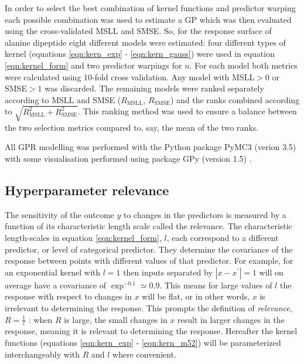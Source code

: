 In order to select the best combination of kernel functions and predictor warping each possible combination was used to estimate a GP which was then evaluated using the cross-validated MSLL and SMSE. So, for the response surface of alanine dipeptide eight different models were estimated: four different types of kernel (equations \ref{eqn:kern_exp} - \ref{eqn:kern_gauss}) were used in equation \ref{eqn:kernel_form} and two predictor warpings for $n$. For each model both metrics were calculated using 10-fold cross validation. Any model with MSLL$ > 0$ or SMSE$ > 1$ was discarded. The remaining models were ranked separately according to MSLL and SMSE ($R_{\mathrm{MSLL}}$, $R_{\mathrm{SMSE}}$) and the ranks combined according to $\sqrt{R_{\mathrm{MSLL}}^2 + R_{\mathrm{SMSE}}^2}$. This ranking method was used to ensure a balance between the two selection metrics compared to, say, the mean of the two ranks.  

All GPR modelling was performed with the Python package PyMC3 (verion 3.5) \cite{salvatierProbabilisticProgrammingPython2016} with some visualisation performed using package GPy (version 1.5) \cite{gpy2014}. 

\subsection{Hyperparameter relevance}\label{sub:msm_meth_rel}

The sensitivity of the outcome $y$ to changes in the predictors is measured by a function of its characteristic length scale called the relevance. The characteristic length-scales in equation \ref{eqn:kernel_form}, $l$, each correspond to a different predictor, or level of categorical predictor. They determine the covariance of the response between points with different values of that predictor. For example, for an exponential kernel with $l=1$ then inputs separated by $|x-x^{\prime}|= 1$ will on average have a covariance of $\exp^{-0.1}\simeq 0.9$. This means for large values of $l$ the response with respect to changes in $x$ will be flat, or in other words, $x$ is irrelevant to determining the response. This prompts the definition of \emph{relevance}, $R = \frac{1}{l}$ \cite{bernardo1998regression,bergstrajamesbergstraRandomSearchHyperParameter2012}: when $R$ is large, the small changes in $x$ result in larger changes in the response, meaning it is relevant to determining the response. Hereafter the kernel functions (equations \ref{eqn:kern_exp} - \ref{eqn:kern_m52}) will be parameterized interchangeably with $R$ and $l$ where convenient.  

